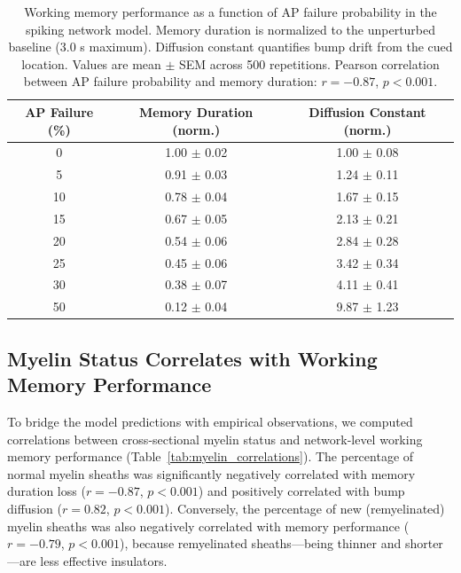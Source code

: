 \documentclass[11pt]{article}
\begin{document}
\begin{table}[H]
\centering
\caption{Working memory performance as a function of AP failure probability in the spiking network model. Memory duration is normalized to the unperturbed baseline (3.0 s maximum). Diffusion constant quantifies bump drift from the cued location. Values are mean $\pm$ SEM across 500 repetitions. Pearson correlation between AP failure probability and memory duration: $r = -0.87$, $p < 0.001$.}
\label{tab:wm_results}
\begin{tabular}{ccc}
\toprule
\textbf{AP Failure (\%)} & \textbf{Memory Duration (norm.)} & \textbf{Diffusion Constant (norm.)} \\
\midrule
0 & 1.00 $\pm$ 0.02 & 1.00 $\pm$ 0.08 \\
5 & 0.91 $\pm$ 0.03 & 1.24 $\pm$ 0.11 \\
10 & 0.78 $\pm$ 0.04 & 1.67 $\pm$ 0.15 \\
15 & 0.67 $\pm$ 0.05 & 2.13 $\pm$ 0.21 \\
20 & 0.54 $\pm$ 0.06 & 2.84 $\pm$ 0.28 \\
25 & 0.45 $\pm$ 0.06 & 3.42 $\pm$ 0.34 \\
30 & 0.38 $\pm$ 0.07 & 4.11 $\pm$ 0.41 \\
50 & 0.12 $\pm$ 0.04 & 9.87 $\pm$ 1.23 \\
\bottomrule
\end{tabular}
\end{table}

\subsection{Myelin Status Correlates with Working Memory Performance}

To bridge the model predictions with empirical observations, we computed correlations between cross-sectional myelin status and network-level working memory performance (Table~\ref{tab:myelin_correlations}). The percentage of normal myelin sheaths was significantly negatively correlated with memory duration loss ($r = -0.87$, $p < 0.001$) and positively correlated with bump diffusion ($r = 0.82$, $p < 0.001$). Conversely, the percentage of new (remyelinated) myelin sheaths was also negatively correlated with memory performance ($r = -0.79$, $p < 0.001$), because remyelinated sheaths---being thinner and shorter---are less effective insulators.
\end{document}
